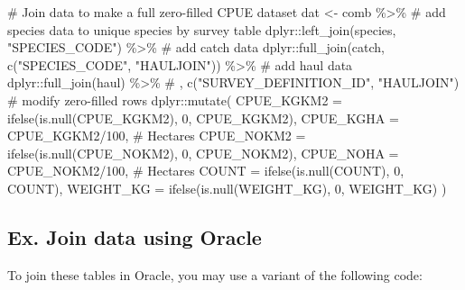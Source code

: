\documentclass[
  letterpaper,
  oneside,
  open=any]{scrbook}
\newenvironment{Shaded}{\begin{snugshade}}{\end{snugshade}}
\newcommand{\AttributeTok}[1]{\textcolor[rgb]{0.40,0.45,0.13}{#1}}
\newcommand{\CommentTok}[1]{\textcolor[rgb]{0.37,0.37,0.37}{#1}}
\newcommand{\DecValTok}[1]{\textcolor[rgb]{0.68,0.00,0.00}{#1}}
\newcommand{\FunctionTok}[1]{\textcolor[rgb]{0.28,0.35,0.67}{#1}}
\newcommand{\NormalTok}[1]{\textcolor[rgb]{0.00,0.23,0.31}{#1}}
\newcommand{\OtherTok}[1]{\textcolor[rgb]{0.00,0.23,0.31}{#1}}
\newcommand{\SpecialCharTok}[1]{\textcolor[rgb]{0.37,0.37,0.37}{#1}}
\newcommand{\StringTok}[1]{\textcolor[rgb]{0.13,0.47,0.30}{#1}}
\begin{document}
\begin{Shaded}
\begin{Highlighting}[]
\CommentTok{\# Join data to make a full zero{-}filled CPUE dataset}
\NormalTok{dat }\OtherTok{\textless{}{-}}\NormalTok{ comb }\SpecialCharTok{\%\textgreater{}\%} 
  \CommentTok{\# add species data to unique species by survey table}
\NormalTok{  dplyr}\SpecialCharTok{::}\FunctionTok{left\_join}\NormalTok{(species, }\StringTok{"SPECIES\_CODE"}\NormalTok{) }\SpecialCharTok{\%\textgreater{}\%} 
  \CommentTok{\# add catch data}
\NormalTok{  dplyr}\SpecialCharTok{::}\FunctionTok{full\_join}\NormalTok{(catch, }\FunctionTok{c}\NormalTok{(}\StringTok{"SPECIES\_CODE"}\NormalTok{, }\StringTok{"HAULJOIN"}\NormalTok{)) }\SpecialCharTok{\%\textgreater{}\%} 
  \CommentTok{\# add haul data}
\NormalTok{  dplyr}\SpecialCharTok{::}\FunctionTok{full\_join}\NormalTok{(haul) }\SpecialCharTok{\%\textgreater{}\%} \CommentTok{\# , c("SURVEY\_DEFINITION\_ID", "HAULJOIN")}
  \CommentTok{\# modify zero{-}filled rows}
\NormalTok{  dplyr}\SpecialCharTok{::}\FunctionTok{mutate}\NormalTok{(}
    \AttributeTok{CPUE\_KGKM2 =} \FunctionTok{ifelse}\NormalTok{(}\FunctionTok{is.null}\NormalTok{(CPUE\_KGKM2), }\DecValTok{0}\NormalTok{, CPUE\_KGKM2),}
    \AttributeTok{CPUE\_KGHA =}\NormalTok{ CPUE\_KGKM2}\SpecialCharTok{/}\DecValTok{100}\NormalTok{, }\CommentTok{\# Hectares}
    \AttributeTok{CPUE\_NOKM2 =} \FunctionTok{ifelse}\NormalTok{(}\FunctionTok{is.null}\NormalTok{(CPUE\_NOKM2), }\DecValTok{0}\NormalTok{, CPUE\_NOKM2),}
    \AttributeTok{CPUE\_NOHA =}\NormalTok{ CPUE\_NOKM2}\SpecialCharTok{/}\DecValTok{100}\NormalTok{, }\CommentTok{\# Hectares}
    \AttributeTok{COUNT =} \FunctionTok{ifelse}\NormalTok{(}\FunctionTok{is.null}\NormalTok{(COUNT), }\DecValTok{0}\NormalTok{, COUNT),}
    \AttributeTok{WEIGHT\_KG =} \FunctionTok{ifelse}\NormalTok{(}\FunctionTok{is.null}\NormalTok{(WEIGHT\_KG), }\DecValTok{0}\NormalTok{, WEIGHT\_KG) ) }
\end{Highlighting}
\end{Shaded}

\subsection{Ex. Join data using
Oracle}\label{ex.-join-data-using-oracle}

To join these tables in Oracle, you may use a variant of the following
code:
\end{document}
